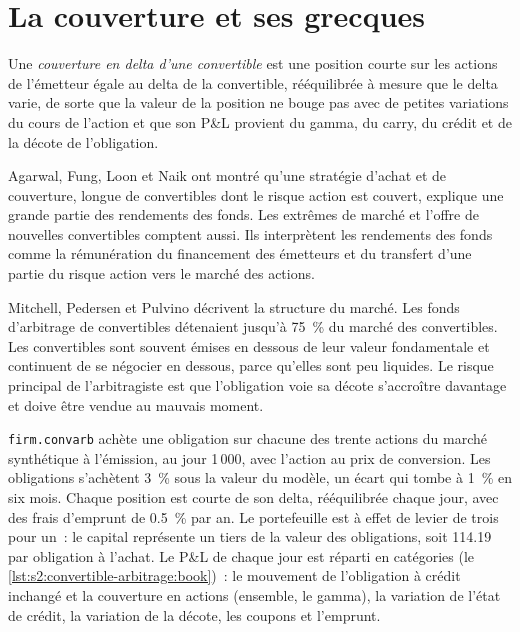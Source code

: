 \section{La couverture et ses grecques}

\begin{definition}\label{def:s2:convertible-arbitrage:delta}
Une \emph{couverture en delta d'une convertible} est une position courte sur les actions de l'émetteur égale au delta de la convertible,
rééquilibrée à mesure que le delta varie, de sorte que la valeur de la position ne bouge pas avec de petites variations du cours de l'action et que son P\&L provient du gamma, du carry,
du crédit et de la décote de l'obligation.
\end{definition}

Agarwal, Fung, Loon et Naik ont montré qu'une stratégie d'achat et de couverture, longue de convertibles dont le risque action est couvert, explique une grande partie
des rendements des fonds. Les extrêmes de marché et l'offre de nouvelles convertibles comptent aussi. Ils interprètent les rendements des fonds comme la rémunération du financement
des émetteurs et du transfert d'une partie du risque action vers le marché des actions.

Mitchell, Pedersen et Pulvino décrivent la structure du marché. Les fonds d'arbitrage de convertibles détenaient jusqu'à 75~\% du marché des convertibles. Les convertibles
sont souvent émises en dessous de leur valeur fondamentale et continuent de se négocier en dessous, parce qu'elles sont peu liquides. Le risque principal de l'arbitragiste est que l'obligation
voie sa décote s'accroître davantage et doive être vendue au mauvais moment.

\texttt{firm.convarb} achète une obligation sur chacune des trente actions du marché synthétique à l'émission, au jour 1\,000, avec l'action au prix de conversion.
Les obligations s'achètent 3~\% sous la valeur du modèle, un écart qui tombe à 1~\% en six mois. Chaque position est courte de son delta, rééquilibrée chaque jour, avec des frais d'emprunt de 0.5~\% par
an. Le portefeuille est à effet de levier de trois pour un~: le capital représente un tiers de la valeur des obligations, soit 114.19 par obligation à l'achat. Le P\&L de chaque jour est réparti en catégories
(le \cref{lst:s2:convertible-arbitrage:book})~: le mouvement de l'obligation à crédit inchangé et la couverture en actions (ensemble, le gamma), la variation de l'état de
crédit, la variation de la décote, les coupons et l'emprunt.

